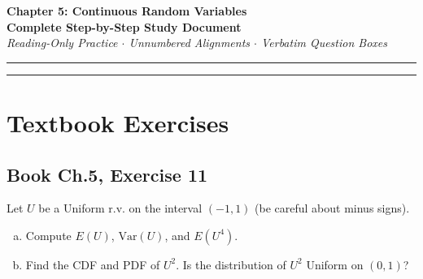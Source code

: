 \documentclass[11pt,a4paper]{article}
\begin{document}
\begin{center}
    {\LARGE \textbf{Chapter 5: Continuous Random Variables}}\\[8pt]
    {\Large \textbf{Complete Step-by-Step Study Document}}\\[6pt]
    {\small \textit{Reading-Only Practice $\cdot$ Unnumbered Alignments $\cdot$ Verbatim Question Boxes}}
\end{center}

\vspace{5pt}
\hrule
\vspace{10pt}

\tableofcontents

\vspace{15pt}
\hrule
\vspace{15pt}

\section{Textbook Exercises}

\subsection{Book Ch.5, Exercise 11}
\begin{tcolorbox}[title={Book Ch.5, Exercise 11}]
Let $U$ be a Uniform r.v. on the interval $(-1, 1)$ (be careful about minus signs).
\begin{enumerate}[(a)]
\item Compute $E(U)$, $\text{Var}(U)$, and $E(U^4)$.
\item Find the CDF and PDF of $U^2$. Is the distribution of $U^2$ Uniform on $(0, 1)$?
\end{enumerate}
\end{tcolorbox}
\end{document}
